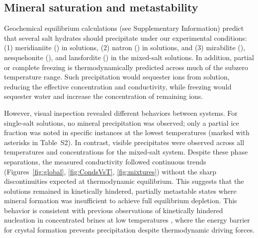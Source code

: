\documentclass[journal=aesccq,manuscript=article]{achemso}
\begin{document}

\subsection{Mineral saturation and metastability}

Geochemical equilibrium calculations (see Supplementary Information) predict that several salt hydrates should precipitate under our experimental conditions: (1) meridianiite () in  solutions, (2) natron () in  solutions, and (3) mirabilite (), nesquehonite (), and lansfordite () in the mixed-salt solutions. In addition, partial or complete freezing is thermodynamically predicted across much of the subzero temperature range. Such precipitation would sequester ions from solution, reducing the effective concentration and conductivity, while freezing would sequester water and increase the concentration of remaining ions.

However, visual inspection revealed different behaviors between systems. For single-salt solutions, no mineral precipitation was observed; only a partial ice fraction was noted in specific instances at the lowest temperatures (marked with asterisks in Table~S2). In contrast, visible precipitates were observed across all temperatures and concentrations for the mixed-salt system. Despite these phase separations, the measured conductivity followed continuous trends (Figures~\ref{fig:global}, \ref{fig:CondsVsT}, \ref{fig:mixtures}) without the sharp discontinuities expected at thermodynamic equilibrium. This suggests that the solutions remained in kinetically hindered, partially metastable states where mineral formation was insufficient to achieve full equilibrium depletion. This behavior is consistent with previous observations of kinetically hindered nucleation in concentrated brines at low temperatures \citep{marion2005effects}, where the energy barrier for crystal formation prevents precipitation despite thermodynamic driving forces.
\end{document}
